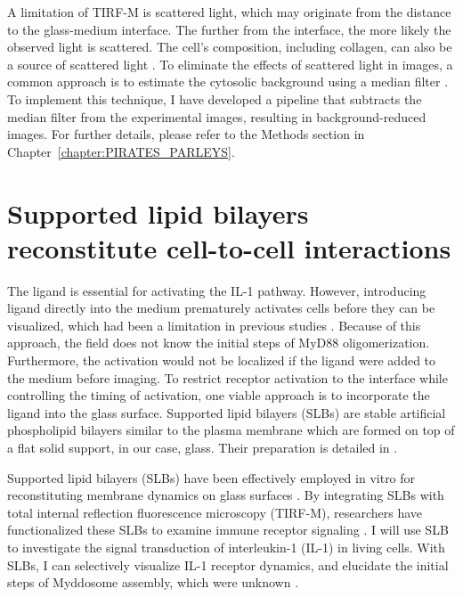 A limitation of TIRF-M is scattered light, which may originate from the distance to the glass-medium interface. The further from the interface, the more likely the observed light is scattered. The cell's composition, including collagen, can also be a source of scattered light \autocite{Axelrod_2021}. To eliminate the effects of scattered light in images, a common approach is to estimate the cytosolic background using a median filter \autocite{Kalaidzidis_2019}. To implement this technique, I have developed a pipeline that subtracts the median filter from the experimental images, resulting in background-reduced images. For further details, please refer to the Methods section in Chapter~\ref{chapter:PIRATES_PARLEYS}.
 
\section{Supported lipid bilayers reconstitute cell-to-cell interactions}
\label{section:SLB}
The ligand is essential for activating the IL-1 pathway. However, introducing ligand directly into the medium prematurely activates cells before they can be visualized, which had been a limitation in previous studies \autocite{Latty_2018}. Because of this approach, the field does not know the initial steps of MyD88 oligomerization. Furthermore, the activation would not be localized if the ligand were added to the medium before imaging. To restrict receptor activation to the interface while controlling the timing of activation, one viable approach is to incorporate the ligand into the glass surface. Supported lipid bilayers (SLBs) are stable artificial phospholipid bilayers similar to the plasma membrane which are formed on top of a flat solid support, in our case, glass. Their preparation is detailed in \autocite{Grakoui_1999}.

Supported lipid bilayers (SLBs) have been effectively employed in vitro for reconstituting membrane dynamics on glass surfaces \autocite{Groves_2003}. By integrating SLBs with total internal reflection fluorescence microscopy (TIRF-M), researchers have functionalized these SLBs to examine immune receptor signaling \autocite{Grakoui_1999}\autocite{ODonoghue_2013}\autocite{Taylor_2017}\autocite{Hui_2019}. I will use SLB to investigate the signal transduction of interleukin-1 (IL-1) in living cells. With SLBs, I can selectively visualize IL-1 receptor dynamics, and elucidate the initial steps of Myddosome assembly, which were unknown \autocite{Latty_2018}.

